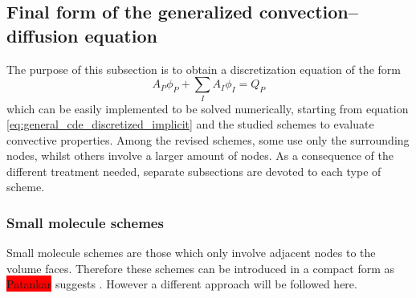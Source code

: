 
\subsection{Final form of the generalized convection--diffusion equation}

The purpose of this subsection is to obtain a discretization equation of the form
\begin{equation}
	A_P \phi_P + \sum_I A_I \phi_I = Q_P
\end{equation}
which can be easily implemented to be solved numerically, starting from equation \eqref{eq:general_cde_discretized_implicit} and the studied schemes to evaluate convective properties. Among the revised schemes, some use only the surrounding nodes, whilst others involve a larger amount of nodes. As a consequence of the different treatment needed, separate subsections are devoted to each type of scheme.

\subsubsection{Small molecule schemes}

Small molecule schemes are those which only involve adjacent nodes to the volume faces. Therefore these schemes can be introduced in a compact form as \colorbox{red}{Patankar} suggests \cite{patankar2008numerical}. However a different approach will be followed here. 

